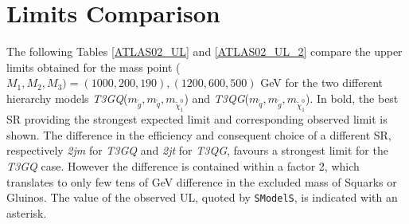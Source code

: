 \documentclass[preprint,number,sort&compress,twocolumn,3p]{elsstyarticle}
\newcommand{\SMO}{\texttt{SModelS\xspace}}
\begin{document}
\section{Limits Comparison}\label{app:ul}
The following Tables \ref{ATLAS02_UL} and \ref{ATLAS02_UL_2}  compare the upper limits obtained for the mass point ($M_1,M_2,M_3) = (1000,200,190),(1200,600,500)$ GeV for the two different hierarchy models \textit{T3GQ}($m_{\tilde g}, m_{\tilde q}, m_{\tilde \chi _1 ^0 }$) and \textit{T3QG}($m_{\tilde q}, m_{\tilde g}, m_{\tilde \chi _1 ^0 }$). In bold, the best SR providing the strongest expected limit and corresponding observed limit is shown. The difference in the efficiency and consequent choice of a different SR, respectively \textit{2jm} for \textit{T3GQ} and \textit{2jt} for \textit{T3QG}, favours a strongest limit for the \textit{T3GQ} case. However the difference is contained within a factor 2, which translates to only few tens of GeV difference in the excluded mass of Squarks or Gluinos. The value of the observed UL, quoted by \SMO, is indicated with an asterisk. 
\end{document}
